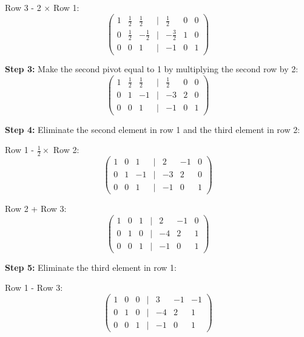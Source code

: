 Row 3 - 2 \(\times\) Row 1:
\begin{equation*}
\begin{pmatrix}
1 & \frac{1}{2} & \frac{1}{2} & | & \frac{1}{2} & 0 & 0 \\
0 & \frac{1}{2} & -\frac{1}{2} & | & -\frac{3}{2} & 1 & 0 \\
0 & 0 & 1 & | & -1 & 0 & 1
\end{pmatrix}
\end{equation*}

\textbf{Step 3:} Make the second pivot equal to 1 by multiplying the second row by 2:
\begin{equation*}
\begin{pmatrix}
1 & \frac{1}{2} & \frac{1}{2} & | & \frac{1}{2} & 0 & 0 \\
0 & 1 & -1 & | & -3 & 2 & 0 \\
0 & 0 & 1 & | & -1 & 0 & 1
\end{pmatrix}
\end{equation*}

\textbf{Step 4:} Eliminate the second element in row 1 and the third element in row 2:

Row 1 - \(\frac{1}{2} \times\) Row 2:
\begin{equation*}
\begin{pmatrix}
1 & 0 & 1 & | & 2 & -1 & 0 \\
0 & 1 & -1 & | & -3 & 2 & 0 \\
0 & 0 & 1 & | & -1 & 0 & 1
\end{pmatrix}
\end{equation*}

Row 2 + Row 3:
\begin{equation*}
\begin{pmatrix}
1 & 0 & 1 & | & 2 & -1 & 0 \\
0 & 1 & 0 & | & -4 & 2 & 1 \\
0 & 0 & 1 & | & -1 & 0 & 1
\end{pmatrix}
\end{equation*}

\textbf{Step 5:} Eliminate the third element in row 1:

Row 1 - Row 3:
\begin{equation*}
\begin{pmatrix}
1 & 0 & 0 & | & 3 & -1 & -1 \\
0 & 1 & 0 & | & -4 & 2 & 1 \\
0 & 0 & 1 & | & -1 & 0 & 1
\end{pmatrix}
\end{equation*}

